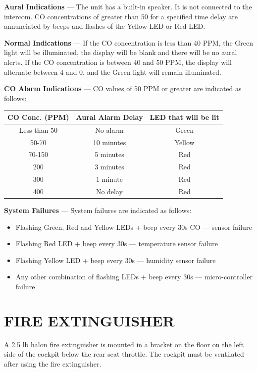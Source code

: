 \textbf{Aural Indications} --- The unit has a built-in speaker. It is not connected to the intercom. CO concentrations of greater than 50 for a specified time delay are annunciated by beeps and flashes of the Yellow LED or Red LED.


\textbf{Normal Indications} --- If the CO concentration is less than 40 PPM, the Green light will be illuminated, the display will be blank and there will be no aural alerts. If the CO concentration is between 40 and 50 PPM, the display will alternate between 4 and 0, and the Green light will remain illuminated.

\begin{minipage}{\textwidth}
\textbf{CO Alarm Indications} --- CO values of 50 PPM or greater are indicated as follows:
\begin{center}
\begin{tabular}
{|c|c|c|} \hline CO Conc. (PPM) & Aural Alarm Delay& LED that will be lit\tabularnewline \hline \hline Less than 50 & No alarm& Green\tabularnewline \hline 50-70& 10 minutes & Yellow\tabularnewline \hline 70-150 & 5 minutes& Red\tabularnewline \hline 200& 3 minutes & Red\tabularnewline \hline 300& 1 minute& Red\tabularnewline \hline 400& No delay & Red\tabularnewline \hline
\end{tabular}
\end{center}
\end{minipage}

\textbf{System Failures} --- System failures are indicated as follows:
\begin{itemize}
\item Flashing Green, Red and Yellow LEDs + beep every 30s CO --- sensor failure
\item Flashing Red LED + beep every 30s --- temperature sensor failure
\item Flashing Yellow LED + beep every 30s --- humidity sensor failure
\item Any other combination of flashing LEDs + beep every 30s --- micro-controller failure
\end{itemize}

\section{FIRE EXTINGUISHER}

A 2.5 lb halon fire extinguisher is mounted in a bracket on the floor on the left side of the cockpit below the rear seat throttle. The cockpit must be ventilated after using the fire extinguisher.

